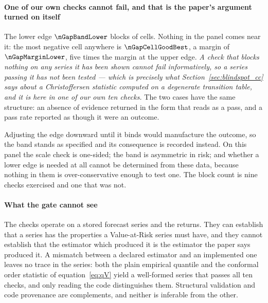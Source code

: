 \paragraph{One of our own checks cannot fail, and that is the paper's argument
turned on itself} The lower edge $\nGapBandLower$ blocks
\nGapCellsLowerBlocks{} of \nGapCellsTotal{} cells. Nothing in the panel comes
near it: the most negative cell anywhere is $\nGapCellGoodBest$, a margin of
$\nGapMarginLower$, five times the margin at the upper edge. \emph{A check that
blocks nothing on any series it has been shown cannot fail informatively, so a
series passing it has not been tested --- which is precisely what
Section~\ref{sec:blindspot_cc} says about a Christoffersen statistic computed on
a degenerate transition table, and it is here in one of our own ten checks.} The
two cases have the same structure: an absence of evidence returned in the form
that reads as a pass, and a pass rate reported as though it were an outcome.

Adjusting the edge downward until it binds would manufacture the outcome, so the
band stands as specified and its consequence is recorded instead. On this panel
the scale check is one-sided; the band is asymmetric in risk; and whether a lower
edge is needed at all cannot be determined from these data, because nothing in
them is over-conservative enough to test one. The block count is nine checks
exercised and one that was not.

\paragraph{What the gate cannot see} The checks operate on a stored forecast
series and the returns. They can establish that a series has the properties a
Value-at-Risk series must have, and they cannot establish that the estimator
which produced it is the estimator the paper says produced it. A mismatch between
a declared estimator and an implemented one leaves no trace in the series: both
the plain empirical quantile and the conformal order statistic of
equation~\eqref{eq:qV} yield a well-formed series that passes all ten checks, and
only reading the code distinguishes them. Structural validation and code
provenance are complements, and neither is inferable from the other.

